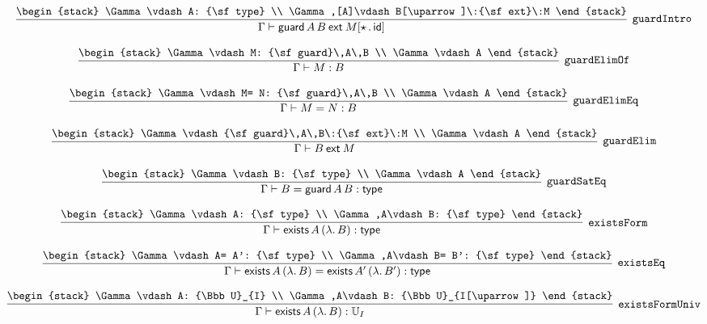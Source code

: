 \[
\infer[{\tt guardIntro}]{\Gamma \vdash {\sf guard}\,A\,B\:{\sf ext}\:M[\star \,.\,{\sf id}]}{
\begin{stack}
\Gamma \vdash A: {\sf type}
\\
\Gamma ,[A]\vdash B[\uparrow ]\:{\sf ext}\:M
\end{stack}}
\]

\[
\infer[{\tt guardElimOf}]{\Gamma \vdash M: B}{
\begin{stack}
\Gamma \vdash M: {\sf guard}\,A\,B
\\
\Gamma \vdash A
\end{stack}}
\]

\[
\infer[{\tt guardElimEq}]{\Gamma \vdash M= N: B}{
\begin{stack}
\Gamma \vdash M= N: {\sf guard}\,A\,B
\\
\Gamma \vdash A
\end{stack}}
\]

\[
\infer[{\tt guardElim}]{\Gamma \vdash B\:{\sf ext}\:M}{
\begin{stack}
\Gamma \vdash {\sf guard}\,A\,B\:{\sf ext}\:M
\\
\Gamma \vdash A
\end{stack}}
\]

\[
\infer[{\tt guardSatEq}]{\Gamma \vdash B= {\sf guard}\,A\,B: {\sf type}}{
\begin{stack}
\Gamma \vdash B: {\sf type}
\\
\Gamma \vdash A
\end{stack}}
\]

\[
\infer[{\tt existsForm}]{\Gamma \vdash {\sf exists}\,A\,(\lambda .\,B): {\sf type}}{
\begin{stack}
\Gamma \vdash A: {\sf type}
\\
\Gamma ,A\vdash B: {\sf type}
\end{stack}}
\]

\[
\infer[{\tt existsEq}]{\Gamma \vdash {\sf exists}\,A\,(\lambda .\,B)= {\sf exists}\,A'\,(\lambda .\,B'): {\sf type}}{
\begin{stack}
\Gamma \vdash A= A': {\sf type}
\\
\Gamma ,A\vdash B= B': {\sf type}
\end{stack}}
\]

\[
\infer[{\tt existsFormUniv}]{\Gamma \vdash {\sf exists}\,A\,(\lambda .\,B): {\Bbb U}_{I}}{
\begin{stack}
\Gamma \vdash A: {\Bbb U}_{I}
\\
\Gamma ,A\vdash B: {\Bbb U}_{I[\uparrow ]}
\end{stack}}
\]

